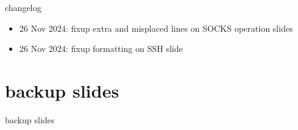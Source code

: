 \date{}
\title{}
\date{}

\begin{frame}
    \titlepage
\end{frame}

{\changelogmode
\begin{frame}{changelog}
    \begin{itemize}
    \item 26 Nov 2024: fixup extra and misplaced lines on SOCKS operation slides
    \item 26 Nov 2024: fixup formatting on SSH slide
    \end{itemize}
\end{frame}
}



\section{backup slides}
\begin{frame}{backup slides}
\end{frame}


